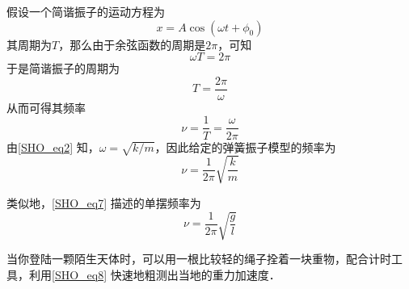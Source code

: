 假设一个简谐振子的运动方程为
\begin{equation}
x = A\cos(\omega t+\phi_0)
\end{equation}
其周期为$T$，那么由于余弦函数的周期是$2\pi$，可知
\begin{equation}
\omega T = 2\pi
\end{equation}
于是简谐振子的周期为
\begin{equation}
T = \frac{2\pi}{\omega}
\end{equation}
从而可得其频率
\begin{equation}
\nu = \frac{1}{T} = \frac{\omega}{2\pi}
\end{equation}
由\autoref{SHO_eq2} 知，$\omega=\sqrt{k/m}$，因此给定的弹簧振子模型的频率为
\begin{equation}
\nu = \frac{1}{2\pi}\sqrt{\frac{k}{m}}
\end{equation}

类似地，\autoref{SHO_eq7} 描述的单摆频率为
\begin{equation}\label{SHO_eq8}
\nu = \frac{1}{2\pi}\sqrt{\frac{g}{l}}
\end{equation}

当你登陆一颗陌生天体时，可以用一根比较轻的绳子拴着一块重物，配合计时工具，利用\autoref{SHO_eq8} 快速地粗测出当地的重力加速度．












